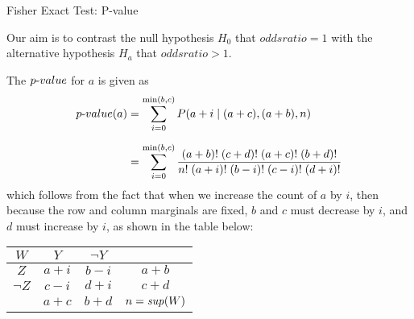 \begin{frame}{F{i}sher Exact Test: P-value}

Our aim is to contrast the null hypothesis $H_0$ that $oddsratio =
1$ with the alternative hypothesis $H_a$ that $oddsratio > 1$.

The ${p\text{-}value}$ for $a$ is given as
\begin{align*}
  {p\text{-}value}(a) & = \sum_{i=0}^{\min(b,c)} P(a+i \mid (a+c),(a+b),n)\\[6pt]
  & =
  \sum_{i=0}^{\min(b,c)}
  \frac{(a+b)!\;(c+d)!\;(a+c)!\;(b+d)!}{n!\;(a+i)!\;(b-i)!\;(c-i)!\;(d+i)!}
\end{align*}
which follows from the fact that when we increase the count of $a$
by $i$, then because the row and column marginals are f\/{i}xed, $b$
and $c$ must decrease by $i$, and $d$ must increase by $i$, as
shown in the table below:
\begin{center} 
\begin{tabular}{|c|cc||c|}
    \hline
    $W$ & $Y$ & $\neg Y$ & \\
    \hline
    $Z$ & $a+i$ & $b-i$ & $a+b$\\
  $\neg Z$ & $c-i$ & $d+i$ & $c+d$\\
  \hline\hline
  & $a+c$ & $b+d$ & $n=\mathit{sup}(W)$\\
  \hline
  \end{tabular}%
\end{center}
\end{frame}


